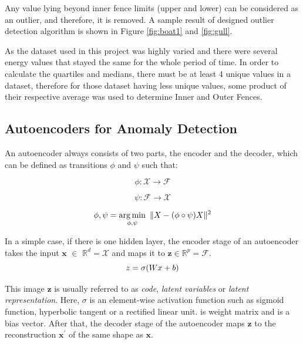 \documentclass[conference]{IEEEtran}
\DeclareMathOperator*{\argmin}{arg\,min}
\begin{document}
Any value lying beyond inner fence limits (upper and lower) can be considered as an 	outlier, and therefore, it is removed. A sample result of designed outlier detection 	algorithm is shown in Figure \ref{fig:boat1} and \ref{fig:gull}.

As the dataset used in this project was highly varied and there were several energy values that stayed the same for the whole period of time. In order to calculate the quartiles and medians, there must be at least 4 unique values in a dataset, therefore for those dataset having less unique values, some product of their respective average was used to determine Inner and Outer Fences. 

\subsection{\label{sec:level3}	Autoencoders for Anomaly Detection}

An autoencoder always consists of two parts, the encoder and the decoder, which can be defined 	as transitions $\phi$ and $\psi$ such that:

\begin{equation}
\phi : \mathcal{X} \to \mathcal{F}
\end{equation}

\begin{equation}
\psi : \mathcal{F} \to \mathcal{X}
\end{equation}

\begin{equation}
\phi , \psi = 
\argmin_{\phi,\psi}\ \| X - (\phi \circ \psi)X  \|^2\\
\end{equation}

In a simple case, if there is one hidden layer, the encoder stage of an autoencoder takes the input $\mathbf{x}$ $\in$ $\mathbb{R}^d = \mathcal{X}$ and maps it to $\mathbf{z} \in \mathbb{R}^p =\mathcal{F}  $.
\begin{equation}
\boldmath{z} = \sigma(Wx+b)
\end{equation}

This image $\mathbf {z} $  is usually referred to as \textit{code}, \textit{latent variables} or \textit{latent representation}. Here, $\sigma$ is an element-wise activation function such as sigmoid function, hyperbolic tangent or a rectified linear unit.  is weight matrix and  is a bias vector. After that, the decoder stage of the autoencoder maps $\mathbf{z}$ to the reconstruction $\mathbf{x^{\prime}}$ of the same shape as $\mathbf{x}$.
\end{document}
